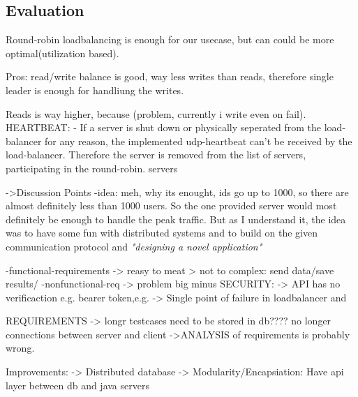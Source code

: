 \documentclass{article}
\begin{document}
\newpage

\subsection{Evaluation}
Round-robin loadbalancing is enough for our usecase, but can could be more optimal(utilization based).

Pros:
read/write balance is good, way less writes than reads, therefore single leader is enough for handliung the writes.

Reads is way higher, because (problem, currently i write even on fail). 
HEARTBEAT:
- If a server is shut down or physically seperated from the load-balancer for any reason, the implemented udp-heartbeat can't be received by the load-balancer. Therefore the server is removed from the list of servers, participating in the round-robin.
servers



->Discussion Points
-idea: meh, why its enought, ids go up to 1000, so there are almost definitely less than 1000 users. So the one provided server would most definitely be enough to handle the peak traffic. But as I understand it, the idea was to have some fun with distributed systems and to build on the given communication protocol and \textit{"designing a novel application"}\cite{ds_4} 


-functional-requirements -> reasy to meat > not to complex: send data/save results/
-nonfunctional-req -> problem
big minus SECURITY:
-> API has no verificaction e.g. bearer token,e.g.
-> Single point of failure in loadbalancer and 

REQUIREMENTS
-> longr testcases need to be stored in db???? no longer connections between server and client
->ANALYSIS of requirements is probably wrong.

Improvements:
-> Distributed database 
-> Modularity/Encapsiation: Have api layer between db and java servers

\printbibliography[heading=bibintoc]
\end{document}
